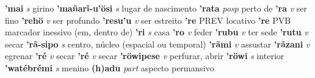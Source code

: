 
\textbf{'mai} \textit{s} {girino}
\textbf{'mañarĩ-u'ösi} \textit{s} {lugar de nascimento}
\textbf{'rata} \textit{posp} {perto de}
\textbf{'ra} \textit{v} {ser fino}
\textbf{'rehö} \textit{v} {ser profundo}
\textbf{'resu'u} \textit{v} {ser estreito}
\textbf{'re} {PREV} {locativo}
\textbf{'re} {PVB} {marcador inessivo (em, dentro de)}
\textbf{'ri} \textit{s} {casa}
\textbf{'ro} \textit{v} {feder}
\textbf{'rubu} \textit{v} {ter sede}
\textbf{'rutu} \textit{v} {secar}
\textbf{'rã-sipo} \textit{s} {centro, núcleo (espacial ou temporal)}
\textbf{'rãmi} \textit{v} {assustar}
\textbf{'rãzani} \textit{v} {egrenar}
\textbf{'ré} \textit{v} {secar}
\textbf{'ré} \textit{v} {secar}
\textbf{'röwipese} \textit{v} {perfurar, abrir}
\textbf{'röwi} \textit{s} {interior}
\textbf{'watébrémi} \textit{s} {menino}
\textbf{(h)adu} \textit{part} {aspecto permansivo}



